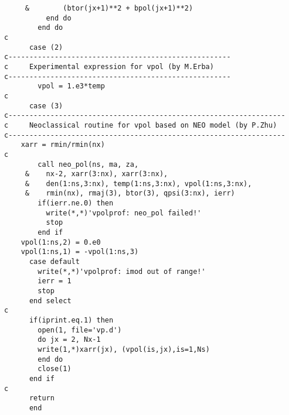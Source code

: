 \begin{verbatim}
     &        (btor(jx+1)**2 + bpol(jx+1)**2)
          end do
        end do
c
      case (2)
c-----------------------------------------------------
c     Experimental expression for vpol (by M.Erba)
c-----------------------------------------------------
        vpol = 1.e3*temp
c
      case (3)
c------------------------------------------------------------------
c     Neoclassical routine for vpol based on NEO model (by P.Zhu)
c------------------------------------------------------------------
	xarr = rmin/rmin(nx)
c 
        call neo_pol(ns, ma, za, 
     &	  nx-2, xarr(3:nx), xarr(3:nx), 
     &	  den(1:ns,3:nx), temp(1:ns,3:nx), vpol(1:ns,3:nx), 
     &    rmin(nx), rmaj(3), btor(3), qpsi(3:nx), ierr)
        if(ierr.ne.0) then
          write(*,*)'vpolprof: neo_pol failed!'
          stop
        end if
	vpol(1:ns,2) = 0.e0
	vpol(1:ns,1) = -vpol(1:ns,3)
      case default
        write(*,*)'vpolprof: imod out of range!'
        ierr = 1
        stop
      end select
c
      if(iprint.eq.1) then
      	open(1, file='vp.d')
      	do jx = 2, Nx-1
      	write(1,*)xarr(jx), (vpol(is,jx),is=1,Ns)
      	end do
      	close(1)
      end if
c
      return
      end
\end{verbatim}


